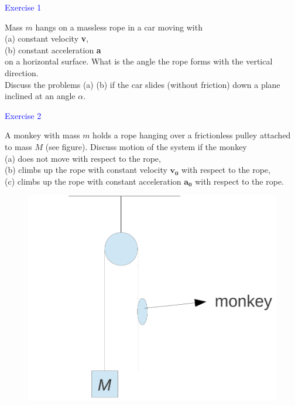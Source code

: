 \documentclass{beamer}
\begin{document}
\begin{frame}
\textcolor{blue}{Exercise 1}

Mass $m$ hangs on a massless rope in a car moving with\\ 
(a) constant velocity \textbf{v},\\
(b) constant acceleration \textbf{a}\\
on a horizontal surface. What is the angle the rope forms with the vertical direction.\\
Discuss the problems (a) (b) if the car slides (without friction) down a plane inclined at an angle $\alpha$.
\end{frame}

\begin{frame}
\textcolor{blue}{Exercise 2}

A monkey with mass $m$ holds a rope hanging over a frictionless pulley attached to mass $M$ (see
figure). Discuss motion of the system if the monkey\\
(a) does not move with respect to the rope,\\
(b) climbs up the rope with constant velocity $\mathbf{v_0}$ with respect to the rope,\\
(c) climbs up the rope with constant acceleration $\mathbf{a_0}$ with respect to the rope.
\begin{figure}[htbp]
\centering
\includegraphics[width=0.4 \linewidth, angle =0]{monkey.png}
\label{fig:2}
\end{figure}
\end{frame}
\end{document}
